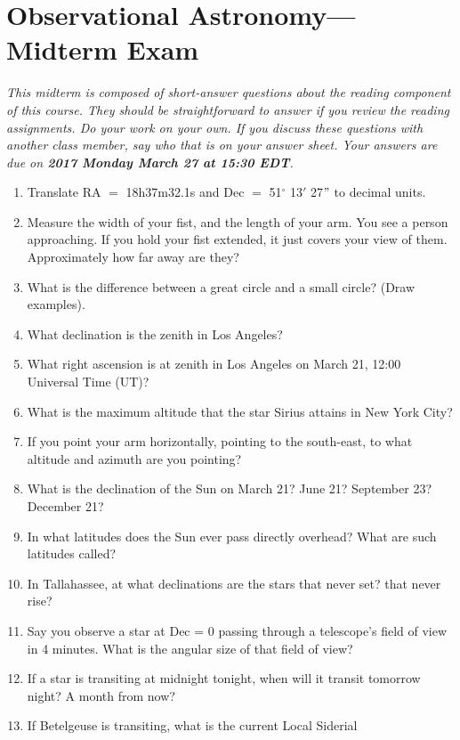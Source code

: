 \documentclass[12pt]{article}
\begin{document}
\section*{Observational Astronomy---Midterm Exam}

\textsl{This midterm is composed of short-answer questions about the
  reading component of this course. They should be straightforward to
  answer if you review the reading assignments. Do your work on your
  own. If you discuss these questions with another class member, say
  who that is on your answer sheet. Your answers are due on
  \textbf{2017 Monday March 27 at 15:30 EDT}.}

\begin{enumerate}
\item Translate RA $=$ 18h37m32.1s and Dec $=$ 51$^\circ$ 13$'$ 27$"$
  to decimal units.
\item Measure the width of your fist, and the length of your arm. You
  see a person approaching. If you hold your fist extended, it just
  covers your view of them.  Approximately how far away are they?
\item What is the difference between a great circle and a small
  circle? (Draw examples).
\item What declination is the zenith in Los Angeles?
\item What right ascension is at zenith in Los Angeles on March 21,
  12:00 Universal Time (UT)?
\item What is the maximum altitude that the star Sirius attains in New
  York City?
\item If you point your arm horizontally, pointing to the south-east,
to what altitude and azimuth are you pointing?
\item  What is the declination of the Sun on March 21? June 21?
  September 23? December 21?
\item In what latitudes does the Sun ever pass directly overhead? What
  are such latitudes called?
\item In Tallahassee, at what declinations are the stars that never set?
  that never rise?
\item Say you observe a star at Dec = 0 passing through a telescope's
  field of view in 4 minutes. What is the angular size of that field
  of view?
\item If a star is transiting at midnight tonight, when will it
  transit tomorrow night? A month from now?
\item If Betelgeuse is transiting, what is the current Local Siderial

\end{enumerate}
\end{document}
